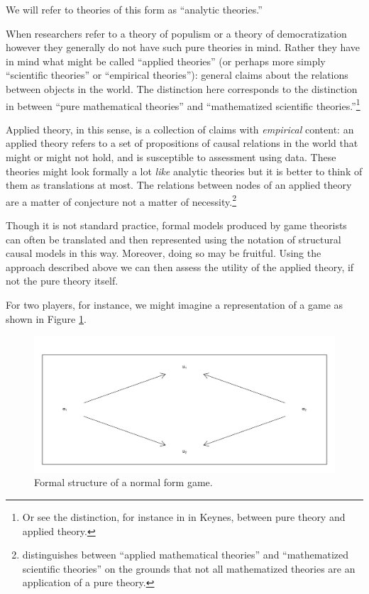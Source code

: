 \documentclass[
  12pt,
]{book}
\begin{document}
We will refer to theories of this form as ``analytic theories.''

When researchers refer to a theory of populism or a theory of democratization however they generally do not have such pure theories in mind. Rather they have in mind what might be called ``applied theories'' (or perhaps more simply ``scientific theories'' or ``empirical theories''): general claims about the relations between objects in the world. The distinction here corresponds to the distinction in \citet{peressini1999applying} between ``pure mathematical theories'' and ``mathematized scientific theories.''\footnote{Or see the distinction, for instance in in Keynes, between pure theory and applied theory.}

Applied theory, in this sense, is a collection of claims with \emph{empirical} content: an applied theory refers to a set of propositions of causal relations in the world that might or might not hold, and is susceptible to assessment using data. These theories might look formally a lot \emph{like} analytic theories but it is better to think of them as translations at most. The relations between nodes of an applied theory are a matter of conjecture not a matter of necessity.\footnote{\citet{peressini1999applying} distinguishes between ``applied mathematical theories'' and ``mathematized scientific theories'' on the grounds that not all mathematized theories are an application of a pure theory.}

Though it is not standard practice, formal models produced by game theorists can often be translated and then represented using the notation of structural causal models in this way. Moreover, doing so may be fruitful. Using the approach described above we can then assess the utility of the applied theory, if not the pure theory itself.

For two players, for instance, we might imagine a representation of a game as shown in Figure \ref{fig:nfg}.

\begin{figure}

{\centering \includegraphics[width=0.8\linewidth]{ii_files/figure-latex/nfg-1} 

}

\caption{Formal structure of a normal form game.}\label{fig:nfg}
\end{figure}
\end{document}
